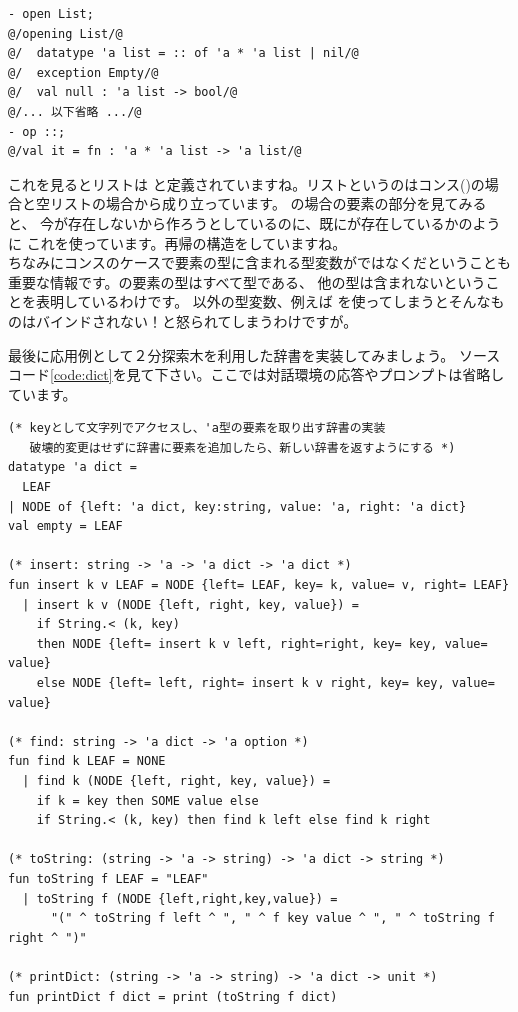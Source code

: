 \documentclass[11pt,a4paper]{article}
\begin{document}
\begin{lstlisting}[caption=リストの定義を確認する,label=code:open-list]
- open List;
@/opening List/@
@/  datatype 'a list = :: of 'a * 'a list | nil/@
@/  exception Empty/@
@/  val null : 'a list -> bool/@
@/... 以下省略 .../@
- op ::;
@/val it = fn : 'a * 'a list -> 'a list/@
\end{lstlisting}

これを見るとリストは
と定義されていますね。リストというのはコンス(\prog{::})の場合と空リストの場合から成り立っています。
\prog{::}の場合の要素の部分を見てみると、
今が存在しないから作ろうとしているのに、既にが存在しているかのように
これを使っています。再帰の構造をしていますね。\\
ちなみにコンスのケースで要素の型に含まれる型変数がではなくだということも
重要な情報です。の要素の型はすべて型である、
他の型は含まれないということを表明しているわけです。
以外の型変数、例えば
を使ってしまうとそんなものはバインドされない！と怒られてしまうわけですが。


最後に応用例として２分探索木を利用した辞書を実装してみましょう。
ソースコード\ref{code:dict}を見て下さい。ここでは対話環境の応答やプロンプトは省略しています。

\begin{lstlisting}[caption=２分探索木による辞書の実装,label=code:dict]
(* keyとして文字列でアクセスし、'a型の要素を取り出す辞書の実装
   破壊的変更はせずに辞書に要素を追加したら、新しい辞書を返すようにする *)
datatype 'a dict =
  LEAF
| NODE of {left: 'a dict, key:string, value: 'a, right: 'a dict}
val empty = LEAF

(* insert: string -> 'a -> 'a dict -> 'a dict *)
fun insert k v LEAF = NODE {left= LEAF, key= k, value= v, right= LEAF}
  | insert k v (NODE {left, right, key, value}) =
    if String.< (k, key)
    then NODE {left= insert k v left, right=right, key= key, value= value}
    else NODE {left= left, right= insert k v right, key= key, value= value}

(* find: string -> 'a dict -> 'a option *)
fun find k LEAF = NONE
  | find k (NODE {left, right, key, value}) =
    if k = key then SOME value else
    if String.< (k, key) then find k left else find k right

(* toString: (string -> 'a -> string) -> 'a dict -> string *)
fun toString f LEAF = "LEAF"
  | toString f (NODE {left,right,key,value}) =
      "(" ^ toString f left ^ ", " ^ f key value ^ ", " ^ toString f right ^ ")"

(* printDict: (string -> 'a -> string) -> 'a dict -> unit *)
fun printDict f dict = print (toString f dict)
\end{lstlisting}
\end{document}
